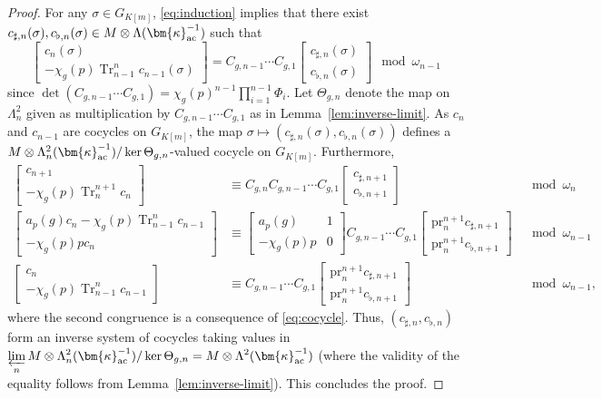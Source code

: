 \documentclass{amsart}
\numberwithin{equation}{section}
\newcommand{\pr}{\mathrm{pr}}
\newcommand{\Tr}{\operatorname{Tr}}
\newcommand{\ac}{\textup{ac}}
\newcommand{\bk}{(\bm{\kappa}_{\ac}^{-1})}
\begin{document}
\begin{proof}
For any $\sigma\in G_{K[m]}$,  \eqref{eq:induction} implies that there exist $c_{\sharp,n}(\sigma),c_{\flat,n}(\sigma)\in M\otimes\Lambda\bk$ such that
\[\begin{bmatrix}
    c_n(\sigma)\\-\chi_g(p)\Tr_{n-1}^nc_{n-1}(\sigma)
\end{bmatrix}=C_{g,n-1}\cdots C_{g,1}\begin{bmatrix}
    c_{\sharp,n}(\sigma)\\c_{\flat,n}(\sigma)
\end{bmatrix}\mod\omega_{n-1}
\]
since $\det(C_{g,n-1}\cdots C_{g,1})=\chi_g(p)^{n-1}\prod_{i=1}^{n-1}\Phi_i$. Let $\Theta_{g,n}$ denote the map on $\Lambda^2_n$ given as multiplication by $C_{g,n-1}\cdots C_{g,1}$ as in Lemma~\ref{lem:inverse-limit}. 
As $c_n$ and $c_{n-1}$ are cocycles on $G_{K[m]}$, the map $\sigma\mapsto(c_{\sharp,n}(\sigma),c_{\flat,n}(\sigma))$ defines a $M\otimes\Lambda_n^2\bk/\ker\Theta_{g,n}$-valued cocycle on $G_{K[m]}$.
Furthermore,
\begin{align*}
    \begin{bmatrix}
    c_{n+1}\\-\chi_g(p)\Tr_{n}^{n+1}c_{n}
\end{bmatrix}&\equiv C_{g,n}C_{g,n-1}\cdots C_{g,1}\begin{bmatrix}
    c_{\sharp,n+1}\\c_{\flat,n+1}
\end{bmatrix}&\mod\omega_{n}\\
\begin{bmatrix}
    a_p(g)c_{n}-\chi_g(p)\Tr_{n-1}^nc_{n-1}\\-\chi_g(p)pc_{n}
\end{bmatrix}&\equiv \begin{bmatrix}
    a_p(g)&1\\-\chi_g(p)p&0
\end{bmatrix}C_{g,n-1}\cdots C_{g,1}\begin{bmatrix}
    \pr_n^{n+1}c_{\sharp,n+1}\\\pr_n^{n+1}c_{\flat,n+1}
\end{bmatrix}&\mod\omega_{n-1}\\
\begin{bmatrix}
    c_{n}\\-\chi_g(p)\Tr_{n-1}^nc_{n-1}
\end{bmatrix}&\equiv C_{g,n-1}\cdots C_{g,1}\begin{bmatrix}
    \pr_n^{n+1}c_{\sharp,n+1}\\\pr_n^{n+1}c_{\flat,n+1}
\end{bmatrix}&\mod\omega_{n-1},
\end{align*}
where the second congruence is a consequence of \eqref{eq:cocycle}.
Thus, $(c_{\sharp,n},c_{\flat,n})$ form an inverse system of cocycles taking values in 
$\displaystyle\varprojlim_n M\otimes\Lambda_n^2\bk/\ker\Theta_{g,n}=M\otimes\Lambda^2\bk$ (where the validity of the equality follows from Lemma~\ref{lem:inverse-limit}). This concludes the proof.
\end{proof}    
\end{document}
